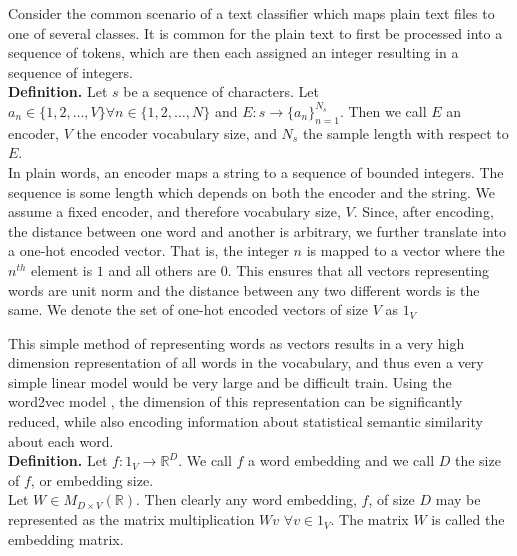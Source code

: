 Consider the common scenario of a text classifier which maps plain text files to one of several classes.  It is common for the plain text to first be processed into a sequence of tokens, which are then each assigned an integer resulting in a sequence of integers.\\

\noindent
\textbf{Definition.}
Let $s$ be a sequence of characters.  Let $a_n \in \{1,2,\dots,V\} \forall n \in \{1,2,\dots,N\}$ and $E:s\rightarrow \{a_n\}_{n=1}^{N_s}$.  Then we call $E$ an encoder, $V$ the encoder vocabulary size, and $N_s$ the sample length with respect to $E$.\\

\noindent
In plain words, an encoder maps a string to a sequence of bounded integers.  The sequence is some length which depends on both the encoder and the string.  We assume a fixed encoder, and therefore vocabulary size, $V$.  Since, after encoding, the distance between one word and another is arbitrary, we further translate into a one-hot encoded vector.  That is, the integer $n$ is mapped to a vector where the $n^{th}$ element is $1$ and all others are $0$.  This ensures that all vectors representing words are unit norm and the distance between any two different words is the same.  We denote the set of one-hot encoded vectors of size $V$ as $1_V$

This simple method of representing words as vectors results in a very high dimension representation of all words in the vocabulary, and thus even a very simple linear model would be very large and be difficult train.  Using the word2vec model \cite{tm13}, the dimension of this representation can be significantly reduced, while also encoding information about statistical semantic similarity about each word.\\

\noindent
\textbf{Definition.}
Let $f: 1_V \rightarrow \mathbb{R}^D$.  We call $f$ a word embedding and we call $D$ the size of $f$, or embedding size.  \\

\noindent
Let $W \in M_{D\times V}(\mathbb{R})$.  Then clearly any word embedding, $f$, of size $D$ may be represented as the matrix multiplication $Wv$ $\forall v \in 1_V$.  The matrix $W$ is called the embedding matrix.\\


